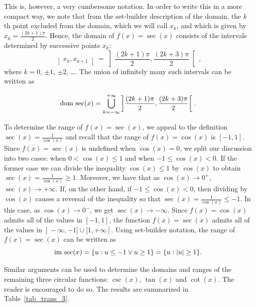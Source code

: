 This is, however,  a very cumbersome notation.   In order to write this in a more compact way, we note that from the set-builder description of the domain, the $k$th point excluded from the domain, which we will call $x_k$, and which is given by  $x_k = \frac{(2k+1)\pi}{2}$. Hence, the domain of $f(x) = \sec(x)$ consists of the intervals determined by successive points 
$x_k$:   
$$\left]x_k, x_{k+1}\right[ = \left] \frac{(2k+1)\pi}{2},  \frac{(2k+3)\pi}{2}\right[\,,$$
where $k = 0$, $\pm 1$, $\pm 2$, \ldots.  The union of infinitely many such intervals can be written as

\[\text{dom}{\,}
\sec(x) =  \bigcup_{k = -\infty}^{+\infty} \left] \frac{(2k+1)\pi}{2}, \frac{(2k+3) \pi}{2} \right[\,. \]

To determine the range of  $f(x) = \sec(x)$, we appeal to the definition $\sec(x) = \frac{1}{\cos(x)}$ and recall that the range of $f(x) = \cos(x)$ is $[-1,1]$. Since $f(x) = \sec(x)$ is  undefined when $\cos(x) = 0$, we split our discussion into two cases: when $0 < \cos(x) \leq 1$ and when $-1 \leq \cos(x) < 0$.  If the former case we can divide the inequality $\cos(x) \leq 1$ by  $\cos(x)$ to obtain  $\sec(x) = \frac{1}{\cos(x)} \geq 1$. Moreover,  we have that as  $\cos(x) \rightarrow  0^+$, $\sec(x) \rightarrow +\infty$. If, on the other hand, if $-1 \leq \cos(x) < 0$, then dividing by $\cos(x)$ causes a reversal of the inequality so that $\sec(x) = \frac{1}{\cos(x)} \leq -1$.  In this case, as $\cos(x) \rightarrow  0^-$, we get $\sec(x) \rightarrow -\infty$. Since $f(x) = \cos(x)$ admits all of the values in $[-1,1]$, the function $f(x) = \sec(x)$ admits all of the values in $\left.\right]-\infty, -1] \cup [1,+\infty\left[\right.$.  Using set-builder notation, the range of $f(x) = \sec(x)$ can be written as $$\text{im}{\,}\sec(x)=\{ u : u \leq -1 \vee u \geq 1 \}=\{ u :|u| \geq 1 \}.$$ 

 Similar arguments can be used to determine the domains and ranges of the remaining three circular functions: $\csc(x)$, $\tan(x)$ and $\cot(x)$.  The reader is encouraged to do so. The results are summarized in Table~\ref{tab_trans_3}.

